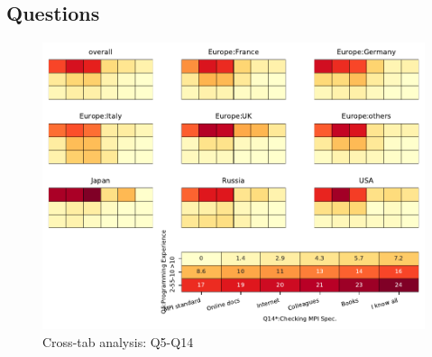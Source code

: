 
\subsection{Questions}


\begin{figure}
\begin{center}
\includegraphics[width=12cm]{../pdfs/Q5-Q14.pdf}
\caption{Cross-tab analysis: Q5-Q14}
\label{fig:Q5-Q14}
\end{center}
\end{figure}
